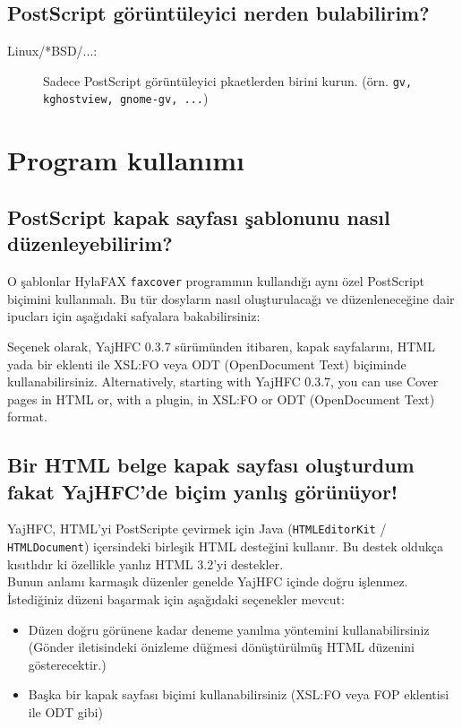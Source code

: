 \documentclass[a4paper,10pt]{scrartcl}
\begin{document}
\subsection{PostScript görüntüleyici nerden bulabilirim?}
\begin{description}
\item[Linux/*BSD/...:] Sadece PostScript görüntüleyici pkaetlerden birini kurun.
		(örn. \texttt{gv, kghostview, gnome-gv, ...})


\end{description}
		
\section{Program kullanımı}

\subsection{PostScript kapak sayfası şablonunu nasıl düzenleyebilirim?}
O şablonlar HylaFAX \texttt{faxcover} programının kullandığı aynı özel PostScript biçimini kullanmalı.
Bu tür dosyların nasıl oluşturulacağı ve düzenleneceğine dair ipucları için aşağıdaki safyalara bakabilirsiniz:


Seçenek olarak, YajHFC 0.3.7 sürümünden itibaren, kapak sayfalarını, HTML yada bir eklenti ile XSL:FO veya ODT (OpenDocument Text) biçiminde kullanabilirsiniz.
Alternatively, starting with YajHFC 0.3.7, you can use Cover pages in HTML or, with a plugin, in XSL:FO or ODT (OpenDocument Text) format.

\subsection{Bir HTML belge kapak sayfası oluşturdum fakat YajHFC'de biçim yanlış görünüyor!}

YajHFC, HTML'yi PostScripte çevirmek için Java (\texttt{HTMLEditorKit} / \texttt{HTMLDocument}) içersindeki birleşik HTML desteğini kullanır. Bu destek oldukça kısıtlıdır ki özellikle yanlız HTML 3.2'yi destekler.\\
Bunun anlamı karmaşık düzenler genelde YajHFC içinde doğru işlenmez.
İstediğiniz düzeni başarmak için aşağıdaki seçenekler mevcut:

\begin{itemize}
 \item Düzen doğru görünene kadar deneme yanılma yöntemini kullanabilirsiniz (Gönder iletisindeki önizleme düğmesi dönüştürülmüş HTML düzenini gösterecektir.)
 \item Başka bir kapak sayfası biçimi kullanabilirsiniz (XSL:FO veya FOP eklentisi ile ODT gibi)
\end{itemize}
\end{document}
